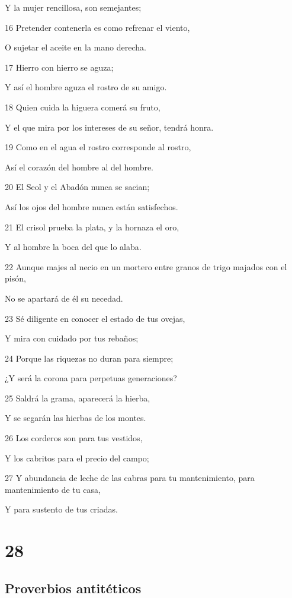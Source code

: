 \par Y la mujer rencillosa, son semejantes;
\par 16 Pretender contenerla es como refrenar el viento,
\par O sujetar el aceite en la mano derecha.
\par 17 Hierro con hierro se aguza;
\par Y así el hombre aguza el rostro de su amigo.
\par 18 Quien cuida la higuera comerá su fruto,
\par Y el que mira por los intereses de su señor, tendrá honra.
\par 19 Como en el agua el rostro corresponde al rostro,
\par Así el corazón del hombre al del hombre.
\par 20 El Seol y el Abadón nunca se sacian;
\par Así los ojos del hombre nunca están satisfechos.
\par 21 El crisol prueba la plata, y la hornaza el oro,
\par Y al hombre la boca del que lo alaba. 
\par 22 Aunque majes al necio en un mortero entre granos de trigo majados con el pisón,
\par No se apartará de él su necedad.
\par 23 Sé diligente en conocer el estado de tus ovejas,
\par Y mira con cuidado por tus rebaños;
\par 24 Porque las riquezas no duran para siempre;
\par ¿Y será la corona para perpetuas generaciones?
\par 25 Saldrá la grama, aparecerá la hierba,
\par Y se segarán las hierbas de los montes.
\par 26 Los corderos son para tus vestidos,
\par Y los cabritos para el precio del campo;
\par 27 Y abundancia de leche de las cabras para tu mantenimiento, para mantenimiento de tu casa,
\par Y para sustento de tus criadas.

\chapter{28}

\section*{Proverbios antitéticos}

